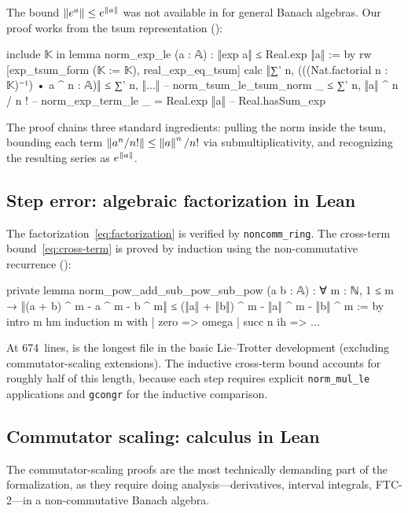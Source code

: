The bound $\left\|e^a\right\| \le e^{\left\|a\right\|}$ was not available in \Mathlib for
general Banach algebras. Our proof works from the tsum representation
():

\begin{leancode}
include 𝕂 in
lemma norm_exp_le (a : 𝔸) : ‖exp a‖ ≤ Real.exp ‖a‖ := by
  rw [exp_tsum_form (𝕂 := 𝕂), real_exp_eq_tsum]
  calc ‖∑' n, (((Nat.factorial n : 𝕂)⁻¹) • a ^ n : 𝔸)‖
      ≤ ∑' n, ‖...‖         -- norm_tsum_le_tsum_norm
    _ ≤ ∑' n, ‖a‖ ^ n / n ! -- norm_exp_term_le
    _ = Real.exp ‖a‖        -- Real.hasSum_exp
\end{leancode}

The proof chains three standard ingredients: pulling the norm inside the tsum,
bounding each term $\left\|a^n/n!\right\| \le \left\|a\right\|^n/n!$ via submultiplicativity,
and recognizing the resulting series as $e^{\left\|a\right\|}$.

\subsection{Step error: algebraic factorization in Lean}
\label{sec:lean-step-error}

The factorization~\eqref{eq:factorization} is verified by \texttt{noncomm\_ring}.
The cross-term bound~\eqref{eq:cross-term} is proved by induction using the
non-commutative recurrence
():

\begin{leancode}
private lemma norm_pow_add_sub_pow_sub_pow (a b : 𝔸) :
    ∀ m : ℕ, 1 ≤ m →
      ‖(a + b) ^ m - a ^ m - b ^ m‖ ≤
        (‖a‖ + ‖b‖) ^ m - ‖a‖ ^ m - ‖b‖ ^ m := by
  intro m hm
  induction m with
  | zero => omega
  | succ n ih => ...
\end{leancode}

At 674~lines,  is the longest file in the basic
Lie--Trotter development (excluding commutator-scaling extensions).
The inductive cross-term bound accounts for roughly half of this length,
because each step requires explicit \texttt{norm\_mul\_le} applications and
\texttt{gcongr} for the inductive comparison.

\subsection{Commutator scaling: calculus in Lean}
\label{sec:lean-commutator}

The commutator-scaling proofs are the most technically demanding part of the
formalization, as they require doing analysis---derivatives, interval integrals,
FTC-2---in a non-commutative Banach algebra.

